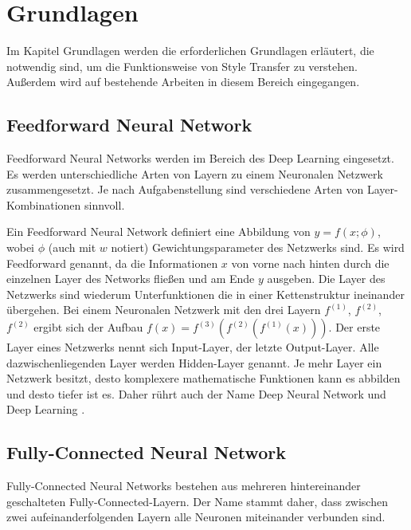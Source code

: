 \chapter{Grundlagen}
\label{cha:fundamentals}

Im Kapitel Grundlagen werden die erforderlichen Grundlagen erläutert, die notwendig sind, um die Funktionsweise von Style Transfer zu verstehen. Außerdem wird auf bestehende Arbeiten in diesem Bereich eingegangen.

\section{Feedforward Neural Network}

Feedforward Neural Networks werden im Bereich des Deep Learning eingesetzt. Es werden unterschiedliche Arten von Layern zu einem Neuronalen Netzwerk zusammengesetzt. Je nach Aufgabenstellung sind verschiedene Arten von Layer-Kombinationen sinnvoll.

Ein Feedforward Neural Network definiert eine Abbildung von $ y = f(x; \phi) $, wobei $ \phi $ (auch mit $ w $ notiert) Gewichtungsparameter des Netzwerks sind. Es wird Feedforward genannt, da die Informationen $ x $ von vorne nach hinten durch die einzelnen Layer des Networks fließen und am Ende $ y $ ausgeben. Die Layer des Netzwerks sind wiederum Unterfunktionen die in einer Kettenstruktur ineinander übergehen. Bei einem Neuronalen Netzwerk mit den drei Layern $ f^{(1)} $, $ f^{(2)} $, $ f^{(2)} $ ergibt sich der Aufbau $ f(x) = f^{(3)}(f^{(2)}(f^{(1)}(x))) $. Der erste Layer eines Netzwerks nennt sich Input-Layer, der letzte Output-Layer. Alle dazwischenliegenden Layer werden Hidden-Layer genannt. Je mehr Layer ein Netzwerk besitzt, desto komplexere mathematische Funktionen kann es abbilden und desto tiefer ist es. Daher rührt auch der Name Deep Neural Network und Deep Learning \cite[164-165]{Goodfellow-et-al-2016}.

\pagebreak

\section{Fully-Connected Neural Network}

Fully-Connected Neural Networks bestehen aus mehreren hintereinander geschalteten Fully-Connected-Layern. Der Name stammt daher, dass zwischen zwei aufeinanderfolgenden Layern alle Neuronen miteinander verbunden sind.

